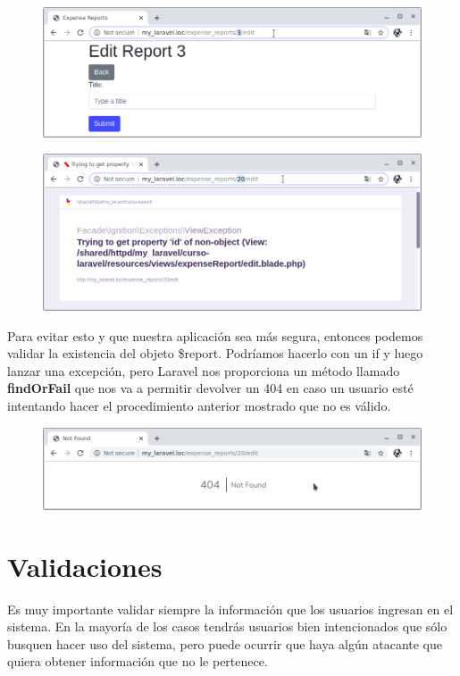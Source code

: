 \documentclass{article}
\begin{document}
\begin{figure}[h!]
  \centering
  \includegraphics[scale=0.5]{./Pictures/083_edit_url_id.png}
\end{figure}

\begin{figure}[h!]
  \centering
  \includegraphics[scale=0.5]{./Pictures/084_edit_url_id_error.png}
\end{figure}

Para evitar esto y que nuestra aplicación sea más segura, entonces podemos
validar la existencia del objeto \$report. Podríamos hacerlo con un if y luego
lanzar una excepción, pero Laravel nos proporciona un método llamado
\textbf{findOrFail} que nos va a permitir devolver un 404 en caso un usuario
esté intentando hacer el procedimiento anterior mostrado que no es válido.\\

\begin{figure}[h!]
  \centering
  \includegraphics[scale=0.5]{./Pictures/085_404_fidOrFail.png}
\end{figure}


\section{Validaciones}%
Es muy importante validar siempre la información que los usuarios ingresan en
el sistema. En la mayoría de los casos tendrás usuarios bien intencionados que
sólo busquen hacer uso del sistema, pero puede ocurrir que haya algún atacante
que quiera obtener información que no le pertenece.\\
\end{document}
